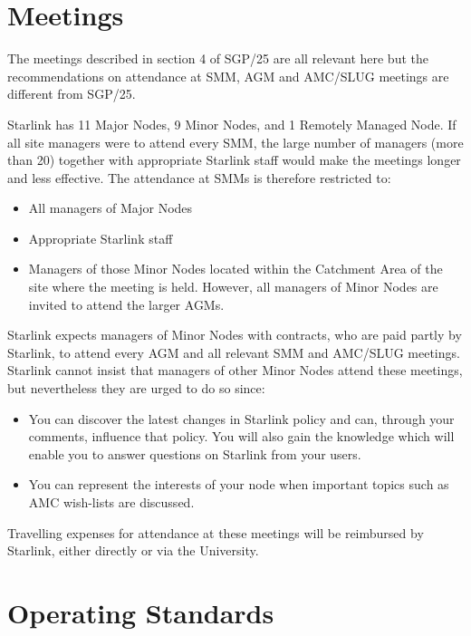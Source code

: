 \section {Meetings}

The meetings described in section 4 of SGP/25 are all relevant here but the
recommendations on attendance at SMM, AGM and AMC/SLUG meetings are different
from SGP/25.
 
Starlink has 11 Major Nodes, 9 Minor Nodes, and 1 Remotely Managed Node.
If all site managers were to attend every SMM, the large number of managers
(more than 20) together with appropriate Starlink staff would make the meetings
longer and less effective.
The attendance at SMMs is therefore restricted to:
\begin{itemize}
\item All managers of Major Nodes
\item Appropriate Starlink staff
\item Managers of those Minor Nodes located within the Catchment Area of the
site where the meeting is held.
However, all managers of Minor Nodes are invited to attend the larger AGMs.
\end{itemize}
 
Starlink expects managers of Minor Nodes with contracts, who are paid partly 
by Starlink, to attend every AGM and all relevant SMM and AMC/SLUG meetings.
Starlink cannot insist that managers of other Minor Nodes attend these meetings,
but nevertheless they are urged to do so since:
\begin{itemize}
\item You can discover the latest changes in Starlink policy and can, through
your comments, influence that policy.
You will also gain the knowledge which will enable you to answer questions on
Starlink from your users.
\item You can represent the interests of your node when important topics
such as AMC wish-lists are discussed.
\end{itemize}
Travelling expenses for attendance at these meetings will be reimbursed by
Starlink, either directly or via the University.

\section {Operating Standards}

